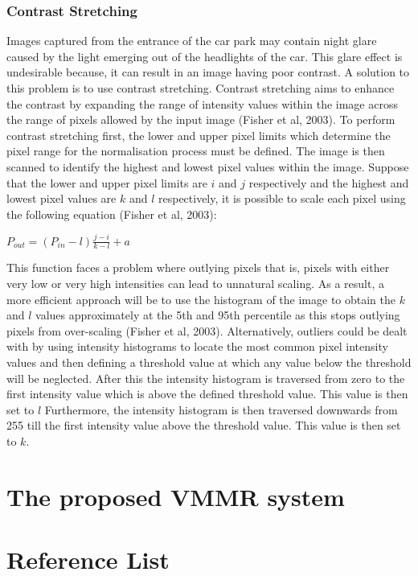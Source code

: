 \documentclass[a4paper, 12pt]{article}
\begin{document}
\subsubsection{Contrast Stretching}
Images captured from the entrance of the car park may contain night glare caused by the light emerging out of the headlights of the car. This glare effect is undesirable because, it can result in an image having poor contrast. A solution to this problem is to use contrast stretching. Contrast stretching aims to enhance the contrast by expanding the range of intensity values within the image across the range of pixels allowed by the input image (Fisher et al, 2003). To perform contrast stretching first, the lower and upper pixel limits which determine the pixel range for the normalisation process must be defined. The image is then scanned to identify the highest and lowest pixel values within the image. Suppose that the lower and upper pixel limits are $i$ and $j$ respectively and the highest and lowest pixel values are $k$ and $l$ respectively, it is possible to scale each pixel using the following equation (Fisher et al, 2003): 

\begin{center}
$P_{out} = (P_{in}-l)\frac{j-i}{k-l} + a$
\end{center}

This function faces a problem where outlying pixels that is, pixels with either very low or very high intensities can lead to unnatural scaling. As a result, a more efficient approach will be to use the histogram of the image to obtain the $k$ and $l$ values approximately at the 5th and 95th percentile as this stops outlying pixels from over-scaling (Fisher et al, 2003). Alternatively, outliers could be dealt with by using intensity histograms to locate the most common pixel intensity values and then defining a threshold value at which any value below the threshold will be neglected. After this the intensity histogram is traversed from zero to the first intensity value which is above the defined threshold value. This value is then set to $l$ Furthermore, the  intensity histogram is then traversed downwards from 255 till the first intensity value above the threshold value. This value is then set to $k$.

\section{The proposed VMMR system}
\newpage

\section{Reference List} 
\end{document}

